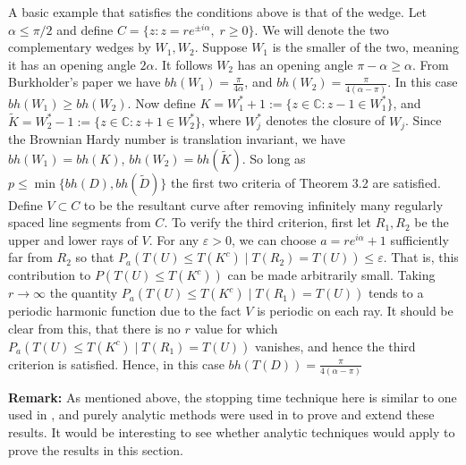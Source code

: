 \documentclass[a4paper, oneside, 12pt]{amsart}
\newcommand{\CC}{\mathbb{C}}
\newcommand{\eps}{\varepsilon}
\begin{document}
A basic example that satisfies the conditions above is that of the wedge. Let $\alpha \leq \pi/2$ and define $C = \{z: z = re^{\pm i\alpha}, \; r\geq 0\}$. We will denote the two complementary wedges by $W_1, W_2$. Suppose $W_1$ is the smaller of the two, meaning
it has an opening angle $2\alpha$. It follows $W_2$ has an opening angle $\pi - \alpha \geq \alpha$. From Burkholder's paper \cite{burk} we have $bh(W_1) = \frac{\pi}{4\alpha}$, and $bh(W_2) = \frac{\pi}{4(\alpha-\pi)}$. In this case $bh(W_1) \geq bh(W_2)$.
Now define $K = W_1^* + 1 := \{z \in \CC: z - 1 \in W_1^*\}$, and $\tilde K = W_2^* - 1:= \{z \in \CC: z + 1 \in W_2^*\}$, where $W_j^*$ denotes the closure of $W_j$. Since the Brownian Hardy number is translation invariant, we have $bh(W_1) = bh(K)$, $bh(W_2) = bh(\tilde K)$. So long as $p \leq \min\{bh(D), bh(\tilde D)\}$ the first two criteria of Theorem 3.2 are satisfied. Define $V\subset C$ to be the resultant curve after removing infinitely many regularly spaced line segments from $C$. To verify the third criterion, first let $R_1, R_2$ be the upper and lower rays of $V$. For any $\eps>0$, we can choose $a=re^{i\alpha}+1$ sufficiently far from $R_2$ so that 
$P_a(T(U) \leq T(K^c)\;|\;T(R_2) = T(U))\leq \eps$. That is, this contribution to 
$P(T(U)\leq T(K^c))$ can be made arbitrarily small. Taking $r\to\infty$ the quantity $P_a(T(U) \leq T(K^c)\;|\;T(R_1) = T(U))$ tends to a periodic
harmonic function due to the fact $V$ is periodic on each ray. It should
be clear from this, that there is no $r$ value for which $P_a(T(U) \leq T(K^c)\;|\;T(R_1) = T(U))$ vanishes, and hence the third criterion is satisfied. Hence, in this case $bh(T(D)) = \frac{\pi}{4(\alpha-\pi)}$
\\
\begin{figure}[H] \label{}
\begin{center}
 
 \caption{}
\end{center}
\end{figure}
{\bf Remark:} As mentioned above, the stopping time technique here is similar to one used in \cite{mecomb}, and purely analytic methods were used in \cite{karafyllia2021hardy, karafyllia2022range} to prove and extend these results. It would be interesting to see whether analytic techniques would apply to prove the results in this section. 
\end{document}
